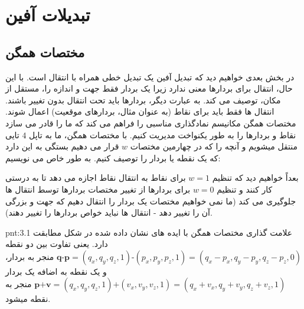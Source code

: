 \section{\textbf{تبدیلات آفین}}
\label{sec:3.2}
\subsection{\textbf{مختصات همگن}}
{
    \Large
    در بخش بعدی خواهیم دید که تبدیل آفین یک تبدیل خطی همراه با انتقال است.
    با این حال، انتقال برای بردارها معنی ندارد زیرا یک بردار فقط جهت و اندازه را، مستقل از مکان، توصیف می کند.
    به عبارت دیگر، بردارها باید تحت انتقال بدون تغییر باشند.
    انتقال ها فقط باید برای نقاط (به عنوان مثال، بردارهای موقعیت) اعمال شوند.
مختصات همگن مکانیسم نمادگذاری مناسبی را فراهم می کند که ما را قادر می سازد نقاط و بردارها را به طور یکنواخت مدیریت کنیم.
با مختصات همگن، ما به تاپل $4$ تایی منتقل میشویم و آنچه را که در چهارمین مختصات $w$ قرار می دهیم بستگی به این دارد که یک نقطه یا بردار را توصیف کنیم.
به طور خاص می نویسیم:
    \begin{spacing}{1.5}

        بعداً خواهیم دید که تنظیم $w=1$ برای نقاط به انتقال نقاط اجازه می دهد تا به درستی کار کنند
        و تنظیم $w=0$  برای بردارها از تغییر مختصات بردارها توسط انتقال ها جلوگیری می کند
        (ما نمی خواهیم مختصات یک بردار را انتقال دهیم که جهت و بزرگی آن را تغییر دهد - انتقال ها نباید خواص بردارها را تغییر دهند).

        \begin{point}{pnt:3.1}
            \Large
            علامت گذاری مختصات همگن با ایده های نشان داده شده در شکل \label{fig:4.Session.1.1.17} مطابقت دارد.
            یعنی تفاوت بین دو نقطه $\textbf{q-p}=(q_{x},q_{y},q_{z},1)\textbf{-}(p_{x},p_{y},p_{z},1)=(q_{x}-p_{x},q_{y}-p_{y},q_{z}-p_{z},0)$ منجر به بردار،
            و یک نقطه به اضافه یک بردار $\textbf{p+v}=(q_{x},q_{y},q_{z},1)\textbf{+}(v_{x},v_{y},v_{z},1)=(q_{x}+v_{x},q_{y}+v_{y},q_{z}+v_{z},1)$ منجر به نقطه میشود.
        \end{point}
    \end{spacing}
}

